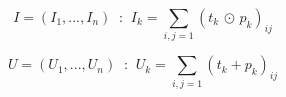 \begin{equation}
I = (I_{1}, ..., I_{n}) \; \; \textbf{:} \; \; I_{k} = \sum_{i,j=1}(t_{k} \, \odot \,  p_{k})_{ij}
\label{eq:i}
\end{equation}

\begin{equation}
U = (U_{1}, ..., U_{n}) \; \; \textbf{:} \; \; U_{k} =  \sum_{i,j=1}(t_{k} + p_{k})_{ij}
\label{eq:u}
\end{equation}



